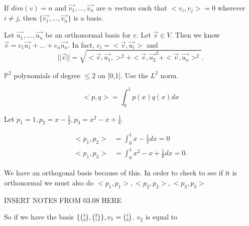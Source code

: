   \begin{corollary}
    If $dim(v)=n$ and $\vec{v_1},\ldots,\vec{v_n}$ are $n$ vectors such that $<v_i,v_j> = 0$ wherever $i\neq j$, then $\{\vec{v_1},\ldots,\vec{v_n}\}$ is a basis.
  \end{corollary}

  \begin{theorem}
    Let $\vec{u_1},\ldots,\vec{u_n}$ be an orthonormal basis for $v$. Let $\vec{v}\in V$. Then we know $\vec{v}=c_1\vec{u_1}+\ldots+c_n \vec{u_n}$. In fact, $c_i=<\vec{v},\vec{u_i}>$ and 
    \begin{equation}
      | |\vec{v} | | = \sqrt{<\vec{v},\vec{u_1},>^2+<\vec{v},\vec{u_2}^2 + <\vec{v},\vec{u_n}>^2}.
    \end{equation}
  \end{theorem}

  \begin{problem}
    $\mathbb{P}^2$ polynomials of degree $\le 2$ on [0,1]. Use the $L^2$ norm.

    \begin{equation}
      <p,q> = \int_0^{1}p(x)q(x)dx
    \end{equation}

    Let $p_1=1,p_2=x-\frac{1}{2},p_3=x^2-x+\frac{1}{6}$.

    \begin{align}
      <p_1,p_2> &= \int_0^{1}x-\frac{1}{2}dx=0\\
      <p_1,p_3>&=\int_0^{1}x^2-x+\frac{1}{6}dx=0.
    \end{align}

    We have an orthogonal basis because of this. In order to check to see if it is orthonormal we must also do $<p_1,p_1>,<p_2,p_2>,<p_3,p_3>$
  \end{problem}
  INSERT NOTES FROM 03.08 HERE

  So if we have the basis $\{\SmallMatrix{1\\2},\SmallMatrix{2\\1}\}, v_1=\SmallMatrix{1\\2}$. $v_2$ is equal to 

